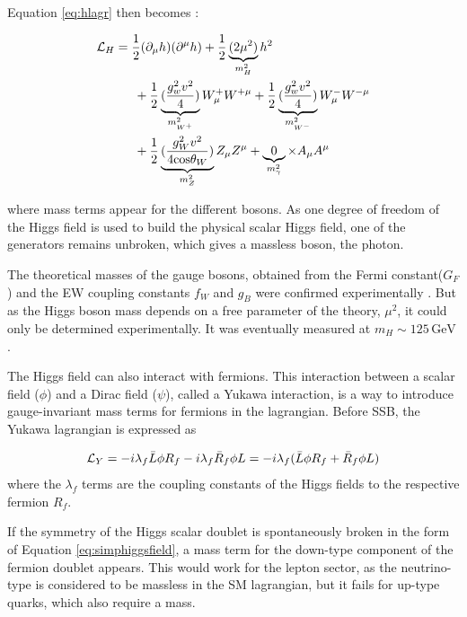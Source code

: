 Equation \ref{eq:hlagr} then becomes :

\begin{align}
    \MoveEqLeft[3]
    \Lagr_H = \frac{1}{2}(\partial_{\mu}h)(\partial^{\mu}h) + \frac{1}{2}\underbrace{(2\mu^2 )}_{m_{H}^2}h^2 \\ {}& + \frac{1}{2} \underbrace{(\frac{g_{w}^2 v^2}{4})}_{m_{W^+}^2} W_{\mu}^+ W^{+\mu} + \frac{1}{2} \underbrace{(\frac{g_{w}^2 v^2}{4})}_{m_{W^-}^2} W_{\mu}^- W^{-\mu} \\ {}& + \frac{1}{2} \underbrace{(\frac{g_W^2 v^2}{4\mathrm{cos}\theta_W})}_{m_Z^2} Z_{\mu} Z^{\mu} + \underbrace{0}_{m_{\gamma}^2}\times A_{\mu}A^{\mu}
\end{align} 

where mass terms appear for the different bosons. As one degree of freedom of the Higgs field is used to build the physical scalar Higgs field, one of the generators remains unbroken, which gives a massless boson, the photon.

The theoretical masses of the gauge bosons, obtained from the Fermi constant($G_F$) and the EW coupling constants $f_W$ and $g_B$ were confirmed experimentally \cite{ARNISON1983103,BANNER1983476,1983398,BAGNAIA1983130,Group:2008ds}. But as the Higgs boson mass depends on a free parameter of the theory, $\mu^2$, it could only be determined experimentally. It was eventually measured at $m_H \sim 125\,{\mathrm{GeV}}$ \cite{Aad2016}.\newline

The Higgs field can also interact with fermions. This interaction between a scalar field ($\phi$) and a Dirac field ($\psi$), called a Yukawa interaction, is a way to introduce gauge-invariant mass terms for fermions in the lagrangian. Before SSB, the Yukawa lagrangian is expressed as 

\begin{equation}
    \mathcal{L}_{Y} = -i\lambda_f \Bar{L} \phi R_f - i\lambda_f\Bar{R}_f \phi L = -i\lambda_f (\Bar{L}\phi R_f + \Bar{R}_f \phi L)
\end{equation}
where the $\lambda_f$ terms are the coupling constants of the Higgs fields to the respective fermion $R_f$.

If the symmetry of the Higgs scalar doublet is spontaneously broken in the form of Equation \ref{eq:simphiggsfield}, a mass term for the down-type component of the fermion doublet appears. This would work for the lepton sector, as the neutrino-type is considered to be massless in the SM lagrangian, but it fails for up-type quarks, which also require a mass.

